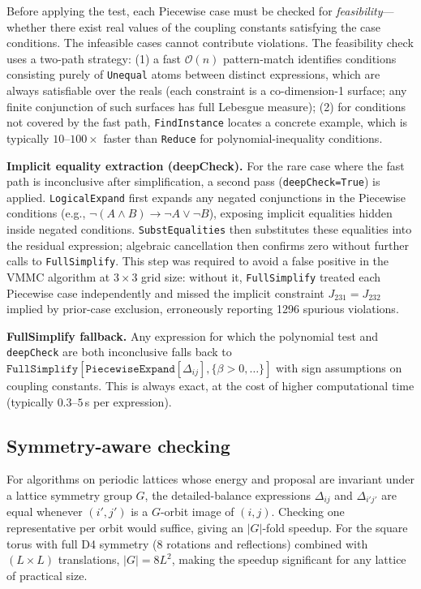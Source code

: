 \documentclass[twocolumn,10pt]{article}
\begin{document}
Before applying the test, each Piecewise case must be checked for
\emph{feasibility}---whether there exist real values of the coupling constants
satisfying the case conditions.  The infeasible cases cannot contribute
violations.  The feasibility check uses a two-path strategy: (1) a fast
$\mathcal{O}(n)$ pattern-match identifies conditions consisting purely of
\texttt{Unequal} atoms between distinct expressions, which are always
satisfiable over the reals (each constraint is a co-dimension-1 surface;
any finite conjunction of such surfaces has full Lebesgue measure);
(2) for conditions not covered by the fast path, \texttt{FindInstance}
locates a concrete example, which is typically $10$--$100\times$ faster than
\texttt{Reduce} for polynomial-inequality conditions.

\medskip\noindent\textbf{Implicit equality extraction (deepCheck).}
For the rare case where the fast path is inconclusive after simplification,
a second pass (\texttt{deepCheck=True}) is applied.
\texttt{LogicalExpand} first expands any negated conjunctions in the
Piecewise conditions (e.g., $\neg(A\wedge B)\to\neg A\vee\neg B$), exposing
implicit equalities hidden inside negated conditions.
\texttt{SubstEqualities} then substitutes these equalities into the residual
expression; algebraic cancellation then confirms zero without further calls
to \texttt{FullSimplify}.  This step was required to avoid a false positive
in the VMMC algorithm at $3\times3$ grid size: without it, \texttt{FullSimplify}
treated each Piecewise case independently and missed the implicit constraint
$J_{231} = J_{232}$ implied by prior-case exclusion, erroneously reporting
1296 spurious violations.

\medskip\noindent\textbf{FullSimplify fallback.}
Any expression for which the polynomial test and \texttt{deepCheck} are both
inconclusive falls back to
$\texttt{FullSimplify}[\texttt{PiecewiseExpand}[\Delta_{ij}], \{\beta>0,\ldots\}]$
with sign assumptions on coupling constants.  This is always exact, at the
cost of higher computational time (typically $0.3$--$5$\,s per expression).

\subsection{Symmetry-aware checking}
\label{sec:symmetry}

For algorithms on periodic lattices whose energy and proposal are invariant
under a lattice symmetry group $G$, the detailed-balance expressions
$\Delta_{ij}$ and $\Delta_{i'j'}$ are equal whenever $(i',j')$ is a
$G$-orbit image of $(i,j)$.  Checking one representative per orbit would
suffice, giving an $|G|$-fold speedup.  For the square torus with full D4
symmetry (8 rotations and reflections) combined with $(L\times L)$
translations, $|G|=8L^2$, making the speedup significant for any lattice
of practical size.
\end{document}
